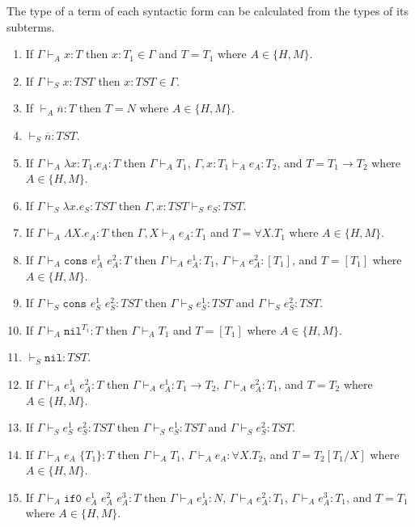 \begin{lemma}
\label{i}
\onehalfspacing
The type of a term of each syntactic form can be calculated from the types of its subterms.
\begin{enumerate}
\item If $\Gamma\vdash_{A}x:T$ then $x:T_{1}\in\Gamma$ and $T=T_{1}$ where $A\in\lbrace H,M\rbrace$.
\item If $\Gamma\vdash_{S}x:TST$ then $x:TST\in\Gamma$.
\item If $\vdash_{A}\overline{n}:T$ then $T=N$ where $A\in\lbrace H,M\rbrace$.
\item $\vdash_{S}\overline{n}:TST$.
\item If $\Gamma\vdash_{A}\lambda x:T_{1}.e_{A}:T$ then $\Gamma\vdash_{A}T_{1}$, $\Gamma,x:T_{1}\vdash_{A}e_{A}:T_{2}$, and $T=T_{1}\rightarrow T_{2}$ where $A\in\lbrace H,M\rbrace$.
\item If $\Gamma\vdash_{S}\lambda x.e_{S}:TST$ then $\Gamma,x:TST\vdash_{S}e_{S}:TST$.
\item If $\Gamma\vdash_{A}\Lambda X.e_{A}:T$ then $\Gamma,X\vdash_{A}e_{A}:T_{1}$ and $T=\forall X.T_{1}$ where $A\in\lbrace H,M\rbrace$.
\item If $\Gamma\vdash_{A}\mathtt{cons}$ $e_{A}^{1}$ $e_{A}^{2}:T$ then $\Gamma\vdash_{A}e_{A}^{1}:T_{1}$, $\Gamma\vdash_{A}e_{A}^{2}:[T_{1}]$, and $T=[T_{1}]$ where $A\in\lbrace H,M\rbrace$.
\item If $\Gamma\vdash_{S}\mathtt{cons}$ $e_{S}^{1}$ $e_{S}^{2}:TST$ then $\Gamma\vdash_{S}e_{S}^{1}:TST$ and $\Gamma\vdash_{S}e_{S}^{2}:TST$.
\item If $\Gamma\vdash_{A}\mathtt{nil}^{T_{1}}:T$ then $\Gamma\vdash_{A}T_{1}$ and $T=[T_{1}]$ where $A\in\lbrace H,M\rbrace$.
\item $\vdash_{S}\mathtt{nil}:TST$.
\item If $\Gamma\vdash_{A}e_{A}^{1}$ $e_{A}^{2}:T$ then $\Gamma\vdash_{A}e_{A}^{1}:T_{1}\rightarrow T_{2}$, $\Gamma\vdash_{A}e_{A}^{2}:T_{1}$, and $T=T_{2}$ where $A\in\lbrace H,M\rbrace$.
\item If $\Gamma\vdash_{S}e_{S}^{1}$ $e_{S}^{2}:TST$ then $\Gamma\vdash_{S}e_{S}^{1}:TST$ and $\Gamma\vdash_{S}e_{S}^{2}:TST$.
\item If $\Gamma\vdash_{A}e_{A}$ $\lbrace T_{1}\rbrace:T$ then $\Gamma\vdash_{A}T_{1}$, $\Gamma\vdash_{A}e_{A}:\forall X.T_{2}$, and $T=T_{2}[T_{1}/X]$ where $A\in\lbrace H,M\rbrace$.
\item If $\Gamma\vdash_{A}\mathtt{if0}$ $e_{A}^{1}$ $e_{A}^{2}$ $e_{A}^{3}:T$ then $\Gamma\vdash_{A}e_{A}^{1}:N$, $\Gamma\vdash_{A}e_{A}^{2}:T_{1}$, $\Gamma\vdash_{A}e_{A}^{3}:T_{1}$, and $T=T_{1}$ where $A\in\lbrace H,M\rbrace$.

\end{enumerate}
\end{lemma}
